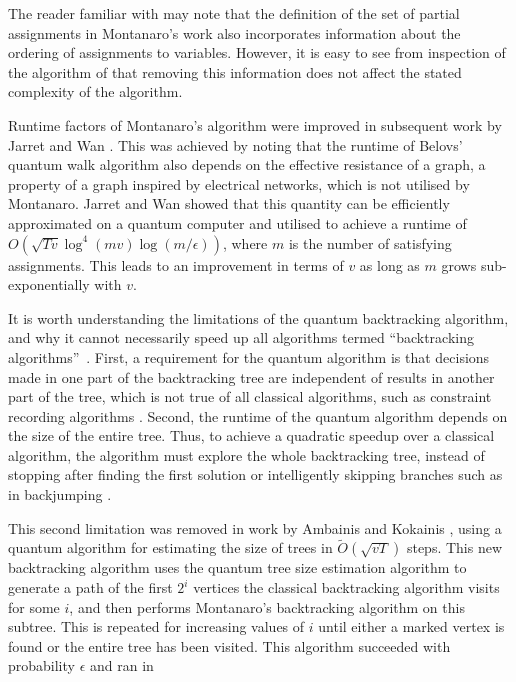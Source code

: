 The reader familiar with \cite{montanaro2015} may note that the definition of the set of partial assignments in Montanaro's work also incorporates information about the ordering of assignments to variables. However, it is easy to see from inspection of the algorithm of \cite{montanaro2015} that removing this information does not affect the stated complexity of the algorithm.

Runtime factors of Montanaro's algorithm were improved in subsequent work by Jarret and Wan \cite{jarret2018}. This was achieved by noting that the runtime of Belovs' quantum walk algorithm also depends on the effective resistance of a graph, a property of a graph inspired by electrical networks, which is not utilised by Montanaro. Jarret and Wan showed that this quantity can be efficiently approximated on a quantum computer and utilised to achieve a runtime of $O(\sqrt{Tv}\log^4(mv)\log(m/\epsilon))$, where $m$ is the number of satisfying assignments. This leads to an improvement in terms of $v$ as long as $m$ grows sub-exponentially with $v$.

It is worth understanding the limitations of the quantum backtracking algorithm, and why it cannot necessarily speed up all algorithms termed ``backtracking algorithms''~\cite{montanaro2015}. First, a requirement for the quantum algorithm is that decisions made in one part of the backtracking tree are independent of results in another part of the tree, which is not true of all classical algorithms, such as constraint recording algorithms \cite{dechter1990}. Second, the runtime of the quantum algorithm depends on the size of the entire tree. Thus, to achieve a quadratic speedup over a classical algorithm, the algorithm must explore the whole backtracking tree, instead of stopping after finding the first solution or intelligently skipping branches such as in backjumping \cite{dechter1990}.

This second limitation was removed in work by Ambainis and Kokainis \cite{ambainis2017}, using a quantum algorithm for estimating the size of trees in $\tilde{O}(\sqrt{vT})$ steps. This new backtracking algorithm uses the quantum tree size estimation algorithm to generate a path of the first $2^i$ vertices the classical backtracking algorithm visits for some $i$, and then performs Montanaro's backtracking algorithm on this subtree. This is repeated for increasing values of $i$ until either a marked vertex is found or the entire tree has been visited. This algorithm succeeded with probability $\epsilon$ and ran in

